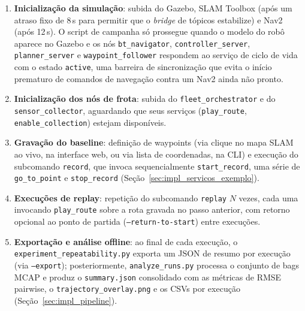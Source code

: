 \begin{enumerate}
    \item \textbf{Inicialização da simulação}: subida do Gazebo, SLAM Toolbox
    (após um atraso fixo de 8\,s para permitir que o \textit{bridge} de
    tópicos estabilize) e Nav2 (após 12\,s). O script de campanha só
    prossegue quando o modelo do robô aparece no Gazebo e os nós
    \texttt{bt\_\allowbreak navigator}, \texttt{controller\_\allowbreak server},
    \texttt{planner\_\allowbreak server} e \texttt{waypoint\_\allowbreak follower}
    respondem ao serviço de ciclo de vida com o estado \texttt{active}, uma
    barreira de sincronização que evita o início prematuro de comandos de
    navegação contra um Nav2 ainda não pronto.

    \item \textbf{Inicialização dos nós de frota}: subida do
    \texttt{fleet\_\allowbreak orchestrator} e do \texttt{sensor\_\allowbreak collector},
    aguardando que seus serviços (\texttt{play\_\allowbreak route},
    \texttt{enable\_\allowbreak collection}) estejam disponíveis.

    \item \textbf{Gravação do baseline}: definição de waypoints (via clique no
    mapa SLAM ao vivo, na interface web, ou via lista de coordenadas, na CLI) e
    execução do subcomando \texttt{record}, que invoca sequencialmente
    \texttt{start\_\allowbreak record}, uma série de \texttt{go\_\allowbreak to\_\allowbreak point} e
    \texttt{stop\_\allowbreak record} (Seção~\ref{sec:impl_servicos_exemplo}).

    \item \textbf{Execuções de replay}: repetição do subcomando \texttt{replay}
    $N$ vezes, cada uma invocando \texttt{play\_\allowbreak route} sobre a rota gravada no
    passo anterior, com retorno opcional ao ponto de partida
    (\texttt{--return-to-start}) entre execuções.

    \item \textbf{Exportação e análise offline}: ao final de cada execução, o
    \texttt{experiment\_\allowbreak repeatability.py} exporta um JSON de resumo por execução
    (via \texttt{--export}); posteriormente, \texttt{analyze\_\allowbreak runs.py} processa
    o conjunto de bags MCAP e produz o \texttt{summary.json} consolidado com as
    métricas de RMSE pairwise, o \texttt{trajectory\_\allowbreak overlay.png} e os CSVs por
    execução (Seção~\ref{sec:impl_pipeline}).
\end{enumerate}

